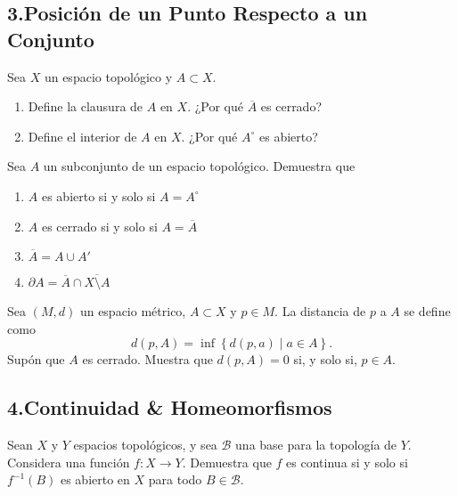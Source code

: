\documentclass[b5paper,10pt,twoside]{book}
\begin{document}
\subsection*{3.\enspace Posición de un Punto Respecto  a un Conjunto}


\begin{problem}
Sea \(X\) un espacio topológico y \(A\subset X\).
\begin{enumerate}[label=(\roman*)]
\item Define la clausura de \(A\) en \(X\). ¿Por qué \(\overline{A}\) es cerrado?
\item Define el interior  de \(A\) en \(X\).  ¿Por qué \({A}^\circ \) es abierto?
\end{enumerate}
\end{problem}

\begin{problem}
Sea \(A\) un subconjunto de un espacio topológico.
Demuestra que 
\begin{enumerate}[label=(\roman*)]
\item \(A\) es abierto si y solo si \(A = A^\circ\)
\item \(A\) es cerrado si y solo si \(A = \overline{A}\)
\item \(\overline{A} = A \cup A'\)
\item \(\partial A = \overline{A}\cap \overline{X\setminus A}   \)
\end{enumerate}
\end{problem}

\begin{problem}
Sea \((M,d)\) un espacio métrico,
\(A\subset X\) y \(p\in M\).
La distancia de \(p\) a \(A\)
se define como 
\[
d(p,A) = \inf\left\{ d(p,a)\mid a\in A \right\}.
\]
Supón que \(A\) es cerrado.
Muestra que \(d(p,A) = 0\) si, y solo si, \(p\in A\).
\end{problem}


\subsection*{4.\enspace Continuidad \& Homeomorfismos}


\begin{problem}
Sean \(X\) y \(Y\) espacios topológicos, y 
sea \(\mathcal{B}\)  una base para la topología de \(Y\).
Considera una función \(f\colon X\to Y\).
Demuestra que \(f\)
es continua si y solo si \(f^{-1}(B)\) es abierto en \(X\) para todo \(B\in \mathcal{B}\).
\end{problem}
\end{document}
